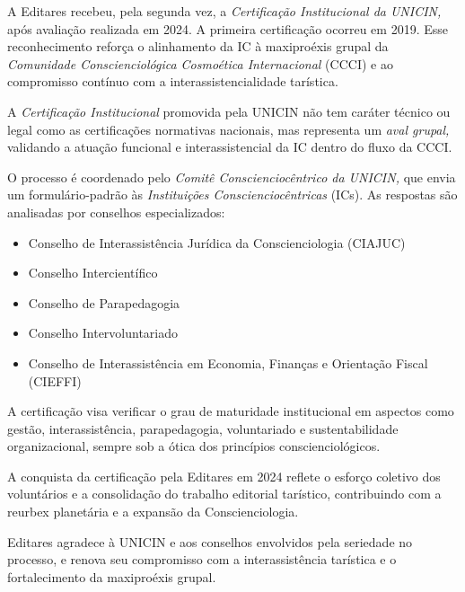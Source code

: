 \documentclass{gescons}
\begin{document}

A Editares recebeu, pela segunda vez, a \emph{Certificação Institucional
da UNICIN,} após avaliação realizada em 2024. A primeira certificação
ocorreu em 2019. Esse reconhecimento reforça o alinhamento da IC à
maxiproéxis grupal da \emph{Comunidade Conscienciológica Cosmoética
Internacional} (CCCI) e ao compromisso contínuo com a
interassistencialidade tarística.

A \emph{Certificação Institucional} promovida pela UNICIN não tem
caráter técnico ou legal como as certificações normativas nacionais, mas
representa um \emph{aval grupal,} validando a atuação funcional e
interassistencial da IC dentro do fluxo da CCCI.

O processo é coordenado pelo \emph{Comitê Conscienciocêntrico da
UNICIN,} que envia um formulário-padrão às \emph{Instituições
Conscienciocêntricas} (ICs). As respostas são analisadas por conselhos
especializados:

\begin{itemize}
\item
  Conselho de Interassistência Jurídica da Conscienciologia (CIAJUC)
\item
  Conselho Intercientífico
\item
  Conselho de Parapedagogia
\item
  Conselho Intervoluntariado
\item
  Conselho de Interassistência em Economia, Finanças e Orientação Fiscal
  (CIEFFI)
\end{itemize}

A certificação visa verificar o grau de maturidade institucional em
aspectos como gestão, interassistência, parapedagogia, voluntariado e
sustentabilidade organizacional, sempre sob a ótica dos princípios
conscienciológicos.

A conquista da certificação pela Editares em 2024 reflete o esforço
coletivo dos voluntários e a consolidação do trabalho editorial
tarístico, contribuindo com a reurbex planetária e a expansão da
Conscienciologia.

Editares agradece à UNICIN e aos conselhos envolvidos pela seriedade no
processo, e renova seu compromisso com a interassistência tarística e o
fortalecimento da maxiproéxis grupal.





        
\end{document}
